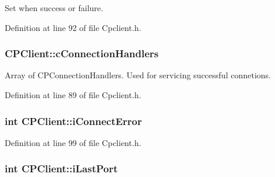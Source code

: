 \-Set when success or failure. 



\-Definition at line 92 of file \-Cpclient.\-h.

\hypertarget{class_c_p_client_a56e74ec04a07eeaa6761cffdc7ce7e88}{
\subsubsection[{c\-Connection\-Handlers}]{ {\bf \-C\-P\-Client\-::c\-Connection\-Handlers}}}\label{class_c_p_client_a56e74ec04a07eeaa6761cffdc7ce7e88}


\-Array of \-C\-P\-Connection\-Handlers. \-Used for servicing successful connetions. 



\-Definition at line 89 of file \-Cpclient.\-h.

\hypertarget{class_c_p_client_a23443904277d6b94147cdc8edf42b725}{
\subsubsection[{i\-Connect\-Error}]{\setlength{\rightskip}{0pt plus 5cm}int {\bf \-C\-P\-Client\-::i\-Connect\-Error}}}\label{class_c_p_client_a23443904277d6b94147cdc8edf42b725}


\-Definition at line 99 of file \-Cpclient.\-h.

\hypertarget{class_c_p_client_a8579466cb047a99e4e3baa735274fb8f}{
\subsubsection[{i\-Last\-Port}]{\setlength{\rightskip}{0pt plus 5cm}int {\bf \-C\-P\-Client\-::i\-Last\-Port}}}\label{class_c_p_client_a8579466cb047a99e4e3baa735274fb8f}


